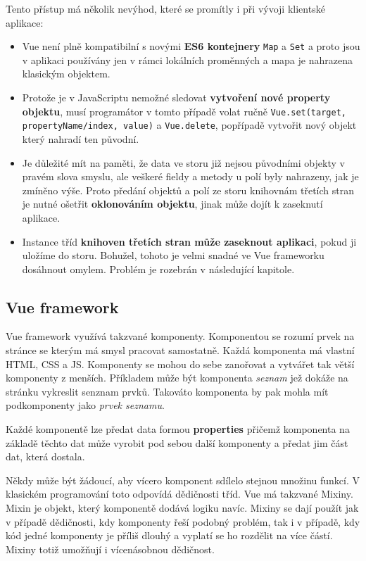 Tento přístup má několik nevýhod, které se promítly i při vývoji klientské aplikace:
\begin{itemize}
  \item Vue není plně kompatibilní s novými \textbf{ES6 kontejnery} \texttt{Map} a \texttt{Set} a proto jsou v aplikaci používány jen v rámci lokálních proměnných a mapa je nahrazena klasickým objektem.
  \item Protože je v JavaScriptu nemožné sledovat \textbf{vytvoření nové property objektu}, musí programátor v tomto případě volat ručně \texttt{Vue.set(target, propertyName/index, value)} a \texttt{Vue.delete}, popřípadě vytvořit nový objekt který nahradí ten původní.
  \item Je důležité mít na paměti, že data ve storu již nejsou původními objekty v pravém slova smyslu, ale veškeré fieldy a metody u polí byly nahrazeny, jak je zmíněno výše. Proto předání objektů a polí ze storu knihovnám třetích stran je nutné ošetřit \textbf{oklonováním objektu}, jinak může dojít k zaseknutí aplikace.
  \item Instance tříd \textbf{knihoven třetích stran může zaseknout aplikaci}, pokud ji uložíme do storu. Bohužel, tohoto je velmi snadné ve Vue frameworku dosáhnout omylem. Problém je rozebrán v následující kapitole.
\end{itemize}

\subsection{Vue framework}
Vue framework využívá takzvané komponenty. Komponentou se rozumí prvek na stránce se kterým má smysl pracovat samostatně. Každá komponenta má vlastní HTML, CSS a JS. Komponenty se mohou do sebe zanořovat a vytvářet tak větší komponenty z menších. Příkladem může být komponenta \textit{seznam} jež dokáže na stránku vykreslit senznam prvků. Takováto komponenta by pak mohla mít podkomponenty jako \textit{prvek seznamu}.

Každé komponentě lze předat data formou \textbf{properties} přičemž komponenta na základě těchto dat může vyrobit pod sebou další komponenty a předat jim část dat, která dostala.

Někdy může být žádoucí, aby vícero komponent sdílelo stejnou množinu funkcí. V klasickém programování toto odpovídá dědičnosti tříd. Vue má takzvané Mixiny. Mixin je objekt, který komponentě dodává logiku navíc. Mixiny se dají použít jak v případě dědičnosti, kdy komponenty řeší podobný problém, tak i v případě, kdy kód jedné komponenty je příliš dlouhý a vyplatí se ho rozdělit na více částí. Mixiny totiž umožňují i vícenásobnou dědičnost.

